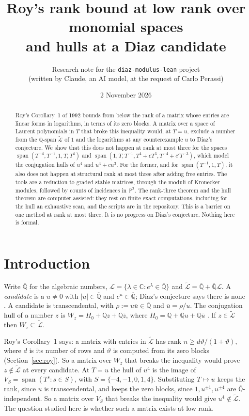 \documentclass[11pt,a4paper]{article}
\title{Roy's rank bound at low rank over monomial spaces\\
and hulls at a Diaz candidate}
\author{Research note for the \texttt{diaz-modulus-lean} project\\
(written by Claude, an AI model, at the request of Carlo Perassi)}
\date{2 November 2026}
\theoremstyle{plain}
\theoremstyle{definition}
\newcommand{\C}{\mathbb{C}}
\newcommand{\Qbar}{\overline{\mathbb{Q}}}
\newcommand{\cL}{\mathcal{L}}
\newcommand{\Lt}{\widetilde{\mathcal{L}}}
\newcommand{\spn}{\operatorname{span}}
\newcommand{\vth}{\vartheta}
\begin{document}
\maketitle

\begin{abstract}
Roy's Corollary~1 of 1992 bounds from below the rank of a matrix whose entries are linear forms in logarithms, in terms of
its zero blocks. A matrix over a space of Laurent polynomials in $T$ that broke this inequality would, at $T=u$,
exclude a number from the $\Qbar$-span $\Lt$ of $1$ and the logarithms at any counterexample $u$ to Diaz's conjecture.
We show that this does not happen at rank at most three for the spaces $\spn(T^{-4},T^{-1},1,T,T^{4})$ and
$\spn(1,T,T^{-1},T^{4}+cT^{3},T^{-4}+c'T^{-3})$, which model the conjugation hulls of $u^{4}$ and $u^{4}+cu^{3}$. For the former, and for
$\spn(T^{-1},1,T)$, it also does not happen at structural rank at most three after adding free entries. The tools are a reduction to graded stable
matrices, through the moduli of Kronecker modules, followed by counts of incidences in $\mathbb{P}^{2}$. The rank-three theorem and the hull theorem are computer-assisted: they rest on finite exact computations, including for the hull an exhaustive scan, and the scripts are in the repository. This is a barrier
on one method at rank at most three. It is no progress on Diaz's conjecture. Nothing here is formal.
\end{abstract}

\section{Introduction}\label{sec:intro}

Write $\Qbar$ for the algebraic numbers, $\cL=\{\lambda\in\C:e^{\lambda}\in\Qbar\}$ and $\Lt=\Qbar+\Qbar\cL$. A
\emph{candidate} is a $u\neq0$ with $|u|\in\Qbar$ and $e^{u}\in\Qbar$; Diaz's conjecture says there is none \cite[\S5.1]{Dia04}.
A candidate is transcendental, with $\rho:=u\bar u\in\Qbar$ and $\bar u=\rho/u$. The conjugation hull of a number $z$ is
$W_{z}=H_{0}+\Qbar z+\Qbar\bar z$, where $H_{0}=\Qbar+\Qbar u+\Qbar\bar u$ \cite{TC}. If $z\in\Lt$ then $W_{z}\subseteq\Lt$.

Roy's Corollary~1 \cite[p.~38]{Roy92} says: a matrix with entries in $\Lt$ has rank $n\ge d\vth/(1+\vth)$, where $d$ is its
number of rows and $\vth$ is computed from its zero blocks (Section~\ref{sec:roy}). So a matrix over $W_{z}$ that breaks the
inequality would prove $z\notin\Lt$ at every candidate. At $T=u$ the hull of $u^{4}$ is the image of
$V_{S}=\spn(T^{s}:s\in S)$, with $S=\{-4,-1,0,1,4\}$. Substituting $T\mapsto u$ keeps the rank, since $u$ is transcendental, and keeps the zero blocks, since $1,u^{\pm1},u^{\pm4}$ are
$\Qbar$-independent. So a matrix over $V_{S}$ that breaks the inequality would give $u^{4}\notin\Lt$. The question studied here is whether such a matrix exists at low rank.
\end{document}
